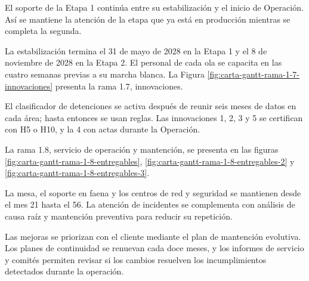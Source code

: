 \documentclass[formulario]{../../comun/overfore}
\begin{document}
\begin{horizontal}
El soporte de la Etapa 1 continúa entre su estabilización y el inicio de Operación. Así se mantiene la atención de la etapa que ya está en producción mientras se completa la segunda.

La estabilización termina el 31 de mayo de 2028 en la Etapa 1 y el 8 de noviembre de 2028 en la Etapa 2. El personal de cada ola se capacita en las cuatro semanas previas a su marcha blanca. La Figura \ref{fig:carta-gantt-rama-1-7-innovaciones} presenta la rama 1.7, innovaciones.

\end{horizontal}
El clasificador de detenciones se activa después de reunir seis meses de datos en cada área; hasta entonces se usan reglas. Las innovaciones 1, 2, 3 y 5 se certifican con H5 o H10, y la 4 con actas durante la Operación.

La rama 1.8, servicio de operación y mantención, se presenta en las figuras \ref{fig:carta-gantt-rama-1-8-entregables}, \ref{fig:carta-gantt-rama-1-8-entregables-2} y \ref{fig:carta-gantt-rama-1-8-entregables-3}.

La mesa, el soporte en faena y los centros de red y seguridad se mantienen desde el mes 21 hasta el 56. La atención de incidentes se complementa con análisis de causa raíz y mantención preventiva para reducir su repetición.

Las mejoras se priorizan con el cliente mediante el plan de mantención evolutiva. Los planes de continuidad se renuevan cada doce meses, y los informes de servicio y comités permiten revisar si los cambios resuelven los incumplimientos detectados durante la operación.
\end{document}
